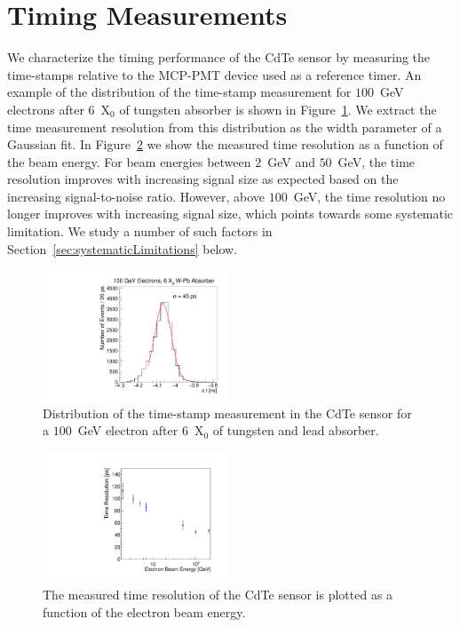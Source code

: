 
\section{Timing Measurements} 
\label{sec:timing} 

We characterize the timing performance of the CdTe sensor by measuring the time-stamps
relative to the MCP-PMT device used as a reference timer. An example of the distribution 
of the time-stamp measurement for $100$~GeV electrons after $6$~$\mathrm{X}_{0}$ of 
tungsten absorber is shown in Figure~\ref{fig:DeltaT}. We extract the time measurement
resolution from this distribution as the width parameter of a Gaussian fit.
In Figure~\ref{fig:TimeResolutionVsEnergy} we show the measured time resolution as a function of the
beam energy. For beam energies between $2$~GeV and $50$~GeV, the time resolution 
improves with increasing signal size as expected based on the increasing signal-to-noise ratio.
However, above $100$~GeV, the time resolution no longer improves with 
increasing signal size, which points towards some systematic limitation. 
We study a number of such factors in Section~\ref{sec:systematicLimitations} below.

\begin{figure}[htbp] 
\centering
\includegraphics[width=0.49\textwidth]{figures/100GeV_deltaT.pdf} 
\caption{Distribution of the time-stamp measurement in the CdTe sensor for a $100$~GeV
electron after $6$~$\mathrm{X}_{0}$ of tungsten and lead absorber. } 
\label{fig:DeltaT} 
\end{figure} 


\begin{figure}[htbp] 
\centering
\includegraphics[width=0.49\textwidth]{figures/TimeResolutionVsEnergy.pdf} 
\caption{ The measured time resolution of the CdTe sensor is plotted as a function
of the electron beam energy. } 
\label{fig:TimeResolutionVsEnergy} 
\end{figure} 


